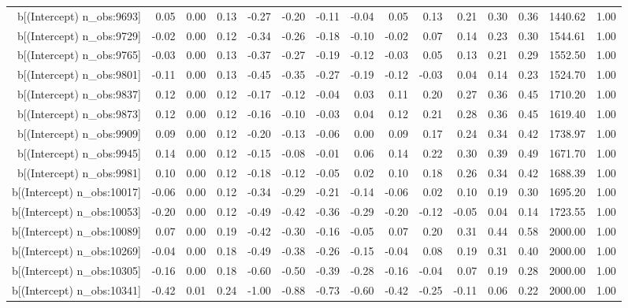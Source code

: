 \begin{table}[ht]
\begin{tabular}{rrrrrrrrrrrrrrr}
  b[(Intercept) n\_obs:9693] & 0.05 & 0.00 & 0.13 & -0.27 & -0.20 & -0.11 & -0.04 & 0.05 & 0.13 & 0.21 & 0.30 & 0.36 & 1440.62 & 1.00 \\ 
  b[(Intercept) n\_obs:9729] & -0.02 & 0.00 & 0.12 & -0.34 & -0.26 & -0.18 & -0.10 & -0.02 & 0.07 & 0.14 & 0.23 & 0.30 & 1544.61 & 1.00 \\ 
  b[(Intercept) n\_obs:9765] & -0.03 & 0.00 & 0.13 & -0.37 & -0.27 & -0.19 & -0.12 & -0.03 & 0.05 & 0.13 & 0.21 & 0.29 & 1552.50 & 1.00 \\ 
  b[(Intercept) n\_obs:9801] & -0.11 & 0.00 & 0.13 & -0.45 & -0.35 & -0.27 & -0.19 & -0.12 & -0.03 & 0.04 & 0.14 & 0.23 & 1524.70 & 1.00 \\ 
  b[(Intercept) n\_obs:9837] & 0.12 & 0.00 & 0.12 & -0.17 & -0.12 & -0.04 & 0.03 & 0.11 & 0.20 & 0.27 & 0.36 & 0.45 & 1710.20 & 1.00 \\ 
  b[(Intercept) n\_obs:9873] & 0.12 & 0.00 & 0.12 & -0.16 & -0.10 & -0.03 & 0.04 & 0.12 & 0.21 & 0.28 & 0.36 & 0.45 & 1619.40 & 1.00 \\ 
  b[(Intercept) n\_obs:9909] & 0.09 & 0.00 & 0.12 & -0.20 & -0.13 & -0.06 & 0.00 & 0.09 & 0.17 & 0.24 & 0.34 & 0.42 & 1738.97 & 1.00 \\ 
  b[(Intercept) n\_obs:9945] & 0.14 & 0.00 & 0.12 & -0.15 & -0.08 & -0.01 & 0.06 & 0.14 & 0.22 & 0.30 & 0.39 & 0.49 & 1671.70 & 1.00 \\ 
  b[(Intercept) n\_obs:9981] & 0.10 & 0.00 & 0.12 & -0.18 & -0.12 & -0.05 & 0.02 & 0.10 & 0.18 & 0.26 & 0.34 & 0.42 & 1688.39 & 1.00 \\ 
  b[(Intercept) n\_obs:10017] & -0.06 & 0.00 & 0.12 & -0.34 & -0.29 & -0.21 & -0.14 & -0.06 & 0.02 & 0.10 & 0.19 & 0.30 & 1695.20 & 1.00 \\ 
  b[(Intercept) n\_obs:10053] & -0.20 & 0.00 & 0.12 & -0.49 & -0.42 & -0.36 & -0.29 & -0.20 & -0.12 & -0.05 & 0.04 & 0.14 & 1723.55 & 1.00 \\ 
  b[(Intercept) n\_obs:10089] & 0.07 & 0.00 & 0.19 & -0.42 & -0.30 & -0.16 & -0.05 & 0.07 & 0.20 & 0.31 & 0.44 & 0.58 & 2000.00 & 1.00 \\ 
  b[(Intercept) n\_obs:10269] & -0.04 & 0.00 & 0.18 & -0.49 & -0.38 & -0.26 & -0.15 & -0.04 & 0.08 & 0.19 & 0.31 & 0.40 & 2000.00 & 1.00 \\ 
  b[(Intercept) n\_obs:10305] & -0.16 & 0.00 & 0.18 & -0.60 & -0.50 & -0.39 & -0.28 & -0.16 & -0.04 & 0.07 & 0.19 & 0.28 & 2000.00 & 1.00 \\ 
  b[(Intercept) n\_obs:10341] & -0.42 & 0.01 & 0.24 & -1.00 & -0.88 & -0.73 & -0.60 & -0.42 & -0.25 & -0.11 & 0.06 & 0.22 & 2000.00 & 1.00 \\ 

\end{tabular}
\end{table}

